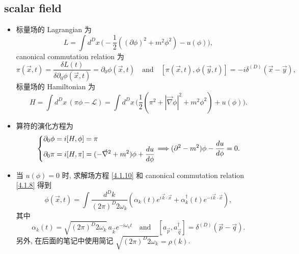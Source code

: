 \subsection{scalar field}
\begin{itemize}
	\item 标量场的 Lagrangian 为
	\begin{equation}
		L = \int d^D x \, \Big( - \frac{1}{2} ((\partial \phi)^2 + m^2 \phi^2) - u(\phi) \Big),
	\end{equation}
	canonical commutation relation 为
	\begin{equation} \label{4.1.8}
		\pi(\vec{x}, t) = \frac{\delta L(t)}{\delta \partial_0 \phi(\vec{x}, t)} = \partial_0 \phi(\vec{x}, t) \quad \text{and} \quad [\pi(\vec{x}, t), \phi(\vec{y}, t)] = - i \delta^{(D)}(\vec{x} - \vec{y}),
	\end{equation}
	标量场的 Hamiltonian 为
	\begin{equation} \label{4.1.9}
		H = \int d^D x \, (\pi \phi - \mathcal{L}) = \int d^D x \, \Big( \frac{1}{2} (\pi^2 + |\vec{\nabla} \phi|^2 + m^2 \phi^2) + u(\phi) \Big).
	\end{equation}
	
	\noindent\hdashrule[0.5ex]{\linewidth}{0.5pt}{1mm} %
	
	\item 算符的演化方程为
	\begin{equation} \label{4.1.10}
		\begin{dcases}
			\partial_0 \phi = i [H, \phi] = \pi \\
			\partial_0 \pi = i [H, \pi] = (- \vec{\nabla}^2 + m^2) \phi + \frac{d u}{d\phi}
		\end{dcases} \Longrightarrow (\partial^2 - m^2) \phi - \frac{d u}{d\phi} = 0.
	\end{equation}
	
	\item 当 $u(\phi) = 0$ 时, 求解场方程 \eqref{4.1.10} 和 canonical commutation relation \eqref{4.1.8} 得到
	\begin{equation} \label{4.1.11}
		\phi(\vec{x}, t) = \int \frac{d^D k}{(2 \pi)^D 2 \omega_k} (\alpha_k(t) e^{i \vec{k} \cdot \vec{x}} + \alpha^\dag_k(t) e^{- i \vec{k} \cdot \vec{x}}),
	\end{equation}
	其中
	\begin{equation}
		\alpha_k(t) = \sqrt{(2 \pi)^D 2 \omega_k} \, a_{\vec{k}} e^{- i \omega_k t} \quad \text{and} \quad [a_{\vec{p}}, a^\dag_{\vec{q}}] = \delta^{(D)}(\vec{p} - \vec{q}).
	\end{equation}
	另外, 在后面的笔记中使用简记 $\sqrt{(2 \pi)^D 2 \omega_k} = \rho(k)$.
	

\end{itemize}
